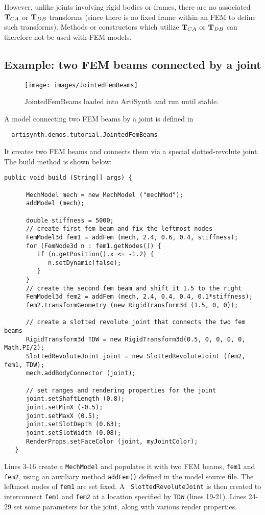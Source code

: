 However, unlike joints involving rigid bodies or frames, there are no
associated ${\bf T}_{CA}$ or ${\bf T}_{DB}$ transforms (since there is no fixed
frame within an FEM to define such transforms).  Methods or
constructors which utilize ${\bf T}_{CA}$ or ${\bf T}_{DB}$ can therefore
not be used with FEM models.

\subsection{Example: two FEM beams connected by a joint}

\begin{figure}[ht]
	\centering
	\texttt{[image: images/JointedFemBeams]}
	\caption{JointedFemBeams loaded into ArtiSynth and run until stable.}
	\label{fig:fem:jointFemBeams}
\end{figure}

A model connecting two FEM beams by a joint
is defined in
%
\begin{verbatim}
  artisynth.demos.tutorial.JointedFemBeams
\end{verbatim}
%
It creates two FEM beams and connects them via a special slotted-revolute
joint. The build method is shown below:
\lstset{numbers=left}
\begin{lstlisting}[]
   public void build (String[] args) {
      
      MechModel mech = new MechModel ("mechMod");
      addModel (mech);
      
      double stiffness = 5000;
      // create first fem beam and fix the leftmost nodes      
      FemModel3d fem1 = addFem (mech, 2.4, 0.6, 0.4, stiffness);
      for (FemNode3d n : fem1.getNodes()) {
         if (n.getPosition().x <= -1.2) {
            n.setDynamic(false);
         }
      }
      // create the second fem beam and shift it 1.5 to the right
      FemModel3d fem2 = addFem (mech, 2.4, 0.4, 0.4, 0.1*stiffness);
      fem2.transformGeometry (new RigidTransform3d (1.5, 0, 0));

      // create a slotted revolute joint that connects the two fem beams
      RigidTransform3d TDW = new RigidTransform3d(0.5, 0, 0, 0, 0, Math.PI/2);
      SlottedRevoluteJoint joint = new SlottedRevoluteJoint (fem2, fem1, TDW);
      mech.addBodyConnector (joint);
      
      // set ranges and rendering properties for the joint
      joint.setShaftLength (0.8);
      joint.setMinX (-0.5);
      joint.setMaxX (0.5);
      joint.setSlotDepth (0.63);
      joint.setSlotWidth (0.08);
      RenderProps.setFaceColor (joint, myJointColor);
   }
\end{lstlisting}
\lstset{numbers=none} Lines 3-16 create a {\tt MechModel} and
populates it with two FEM beams, {\tt fem1} and {\tt fem2}, using an
auxiliary method {\tt addFem()} defined in the model source file.  The
leftmost nodes of {\tt fem1} are set fixed. A {\tt
SlottedRevoluteJoint} is then created to interconnect {\tt fem1} and
{\tt fem2} at a location specified by {\tt TDW} (lines 19-21).  Lines
24-29 set some parameters for the joint, along with various render
properties.

